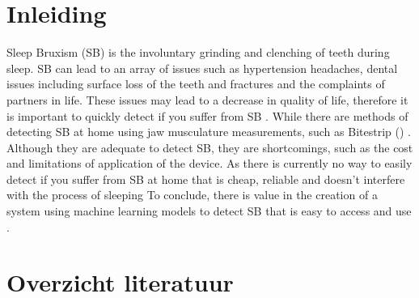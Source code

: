 \documentclass{hogent-article}
\affiliation{
  \textsuperscript{1} \href{mailto:brent.decorte@student.hogent.be}{brent.decorte@student.hogent.be}}
\begin{document}
\flushbottom %
\maketitle %
\tableofcontents %
\thispagestyle{empty} %


\section{Inleiding}


Sleep Bruxism (SB) is the involuntary grinding and clenching of teeth during sleep.
SB can lead to an array of issues such as hypertension headaches, dental issues including surface loss of the teeth and fractures and the complaints of partners in life.
These issues may lead to a decrease in quality of life, therefore it is important to quickly detect if you suffer from SB .
\bigbreak
While there are methods of detecting SB at home using jaw musculature measurements, such as Bitestrip () .
Although they are adequate to detect SB, they are shortcomings, such as the cost and limitations of application of the device.
As there is currently no way to easily detect if you suffer from SB at home that is cheap, reliable and doesn’t interfere with the process of sleeping
To conclude, there is value in the creation of a system using machine learning models to detect SB that is easy to access and use \autocite{Wei_2020} .



\section{Overzicht literatuur}


\end{document}
